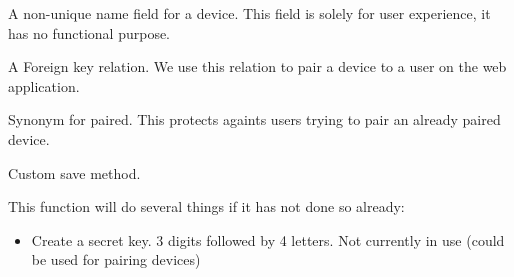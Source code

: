 \documentclass[letterpaper,10pt,english]{sphinxmanual}
\begin{document}
\begin{fulllineitems}
\begin{fulllineitems}
\end{fulllineitems}


\begin{fulllineitems}
\label{modules/microdata:microdata.models.Device.name}
A non-unique name field for a device. This field is solely for user experience, it has no functional purpose.

\end{fulllineitems}


\begin{fulllineitems}
\label{modules/microdata:microdata.models.Device.objects}
\end{fulllineitems}


\begin{fulllineitems}
\label{modules/microdata:microdata.models.Device.owner}
A Foreign key relation. We use this relation to pair a device to a user on the web application.

\end{fulllineitems}


\begin{fulllineitems}
\label{modules/microdata:microdata.models.Device.registered}
Synonym for paired. This protects againts users trying to pair an already paired device.

\end{fulllineitems}


\begin{fulllineitems}
\label{modules/microdata:microdata.models.Device.save}
Custom save method.

This function will do several things if it has not done so already:
\begin{itemize}
\item {} 
Create a secret key. 3 digits followed by 4 letters. Not currently in use (could be used for pairing devices)


\end{itemize}
\end{fulllineitems}
\end{fulllineitems}
\end{document}
